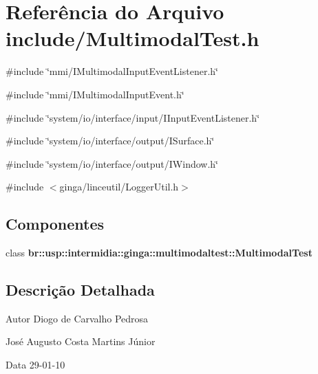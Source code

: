 \section{Referência do Arquivo include/MultimodalTest.h}
\label{MultimodalTest_8h}
{\ttfamily \#include \char`\"{}mmi/IMultimodalInputEventListener.h\char`\"{}}\par
{\ttfamily \#include \char`\"{}mmi/IMultimodalInputEvent.h\char`\"{}}\par
{\ttfamily \#include \char`\"{}system/io/interface/input/IInputEventListener.h\char`\"{}}\par
{\ttfamily \#include \char`\"{}system/io/interface/output/ISurface.h\char`\"{}}\par
{\ttfamily \#include \char`\"{}system/io/interface/output/IWindow.h\char`\"{}}\par
{\ttfamily \#include $<$ginga/linceutil/LoggerUtil.h$>$}\par
\subsection*{Componentes}
\begin{DoxyCompactItemize}
\item 
class {\bf br::usp::intermidia::ginga::multimodaltest::MultimodalTest}
\end{DoxyCompactItemize}


\subsection{Descrição Detalhada}
\begin{DoxyAuthor}{Autor}
Diogo de Carvalho Pedrosa 

José Augusto Costa Martins Júnior 
\end{DoxyAuthor}
\begin{DoxyDate}{Data}
29-\/01-\/10 
\end{DoxyDate}
